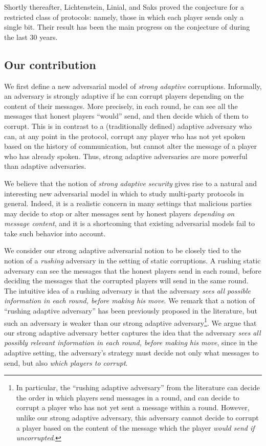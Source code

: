 \documentclass[11pt,letterpaper]{article}
\theoremstyle{plain}
\theoremstyle{definition}
\begin{document}
Shortly thereafter,
Lichtenstein, Linial, and Saks \cite{LLS89} proved the conjecture for a restricted class of protocols: namely, those in which each player sends only a single bit.
Their result has been the main progress on the conjecture of \cite{BL85} during the last 30 years.


\subsection{Our contribution}

We first define a new adversarial model of {\em strong adaptive} corruptions.  
Informally, an adversary is strongly adaptive if he can corrupt players depending on the content of their messages. More precisely, in each round,
he can see all the messages that honest players ``would'' send, and then decide which of them to corrupt. 
This is in contrast to a (traditionally defined) adaptive adversary who can, at any point in the protocol, corrupt any player who has not yet spoken based on the history of communication, but cannot alter the message of a player who has already spoken.
Thus, strong adaptive adversaries are more powerful than adaptive adversaries.

We believe that the notion of \emph{strong adaptive security} gives rise to a natural and interesting new adversarial model
in which to study multi-party protocols in general.
Indeed, it is a realistic concern in many settings that malicious parties may decide to stop or alter messages sent by honest players \emph{depending on message content},
and it is a shortcoming that existing adversarial models fail to take such behavior into account.

We consider our strong adaptive adversarial notion to be closely tied to the notion of a \emph{rushing} adversary in the setting of static corruptions.
A rushing static adversary can see the messages that the honest players
send in each round, before deciding the messages that the corrupted players will send in the same round.
The intuitive idea of a rushing adversary is that the adversary \emph{sees all possible information in each round, before making his move}.
We remark that a notion of ``rushing adaptive adversary'' has been previously proposed in the literature, but such an adversary is weaker
than our strong adaptive adversary\footnote{In particular, the ``rushing adaptive adversary'' from the literature can decide the order in which players
send messages in a round, and can decide to corrupt a player who has not yet sent a message within a round. However, unlike our strong adaptive adversary,
this adversary cannot decide to corrupt a player based on the content of the message which the player \emph{would send if uncorrupted}.}.
We argue that our strong adaptive adversary better captures the idea that the adversary \emph{sees all possibly relevant information in each round, before making his move}, since in the adaptive setting, the adversary's strategy must decide not only what messages to send, but also \emph{which players to corrupt}.
\end{document}
